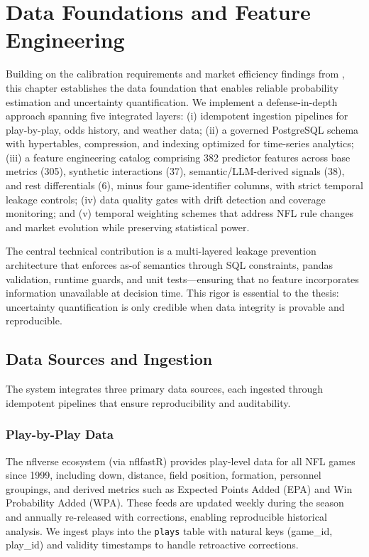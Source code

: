 \chapter{Data Foundations and Feature Engineering}
\label{chap:data}

Building on the calibration requirements and market efficiency findings from , this chapter establishes the data foundation that enables reliable probability estimation and uncertainty quantification. We implement a defense-in-depth approach spanning five integrated layers: (i) idempotent ingestion pipelines for play-by-play, odds history, and weather data; (ii) a governed PostgreSQL schema with hypertables, compression, and indexing optimized for time-series analytics; (iii) a feature engineering catalog comprising 382 predictor features across base metrics (305), synthetic interactions (37), semantic/LLM-derived signals (38), and rest differentials (6), minus four game-identifier columns, with strict temporal leakage controls; (iv) data quality gates with drift detection and coverage monitoring; and (v) temporal weighting schemes that address NFL rule changes and market evolution while preserving statistical power.

The central technical contribution is a multi-layered leakage prevention architecture that enforces as-of semantics through SQL constraints, pandas validation, runtime guards, and unit tests---ensuring that no feature incorporates information unavailable at decision time. This rigor is essential to the thesis: uncertainty quantification is only credible when data integrity is provable and reproducible.



\section{Data Sources and Ingestion}
\label{sec:ingestion}

The system integrates three primary data sources, each ingested through idempotent pipelines that ensure reproducibility and auditability.

\subsection{Play-by-Play Data}
The nflverse ecosystem (via nflfastR) provides play-level data for all NFL games since 1999, including down, distance, field position, formation, personnel groupings, and derived metrics such as Expected Points Added (EPA) and Win Probability Added (WPA). These feeds are updated weekly during the season and annually re-released with corrections, enabling reproducible historical analysis. We ingest plays into the \texttt{plays} table with natural keys (game\_id, play\_id) and validity timestamps to handle retroactive corrections.

